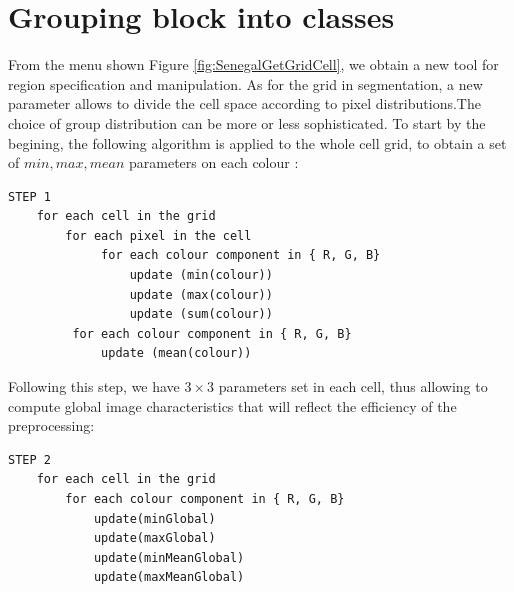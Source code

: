 \section { Grouping block into classes}
\label{sec:classification} 

From the menu shown Figure  \ref{fig:SenegalGetGridCell}, we obtain a new tool for region
specification and manipulation. As for the grid in segmentation, a new parameter allows to divide
the cell space according to pixel distributions.The choice of group distribution  can be more or less sophisticated.
To start by the begining, the following algorithm is applied to the whole cell grid, to obtain a set of $min, max, mean$ parameters
on each colour :

\begin{lstlisting}  
STEP 1
	for each cell in the grid
		for each pixel in the cell 
			 for each colour component in { R, G, B}
				 update (min(colour))
				 update (max(colour))
				 update (sum(colour))
		 for each colour component in { R, G, B}
			 update (mean(colour))
\end{lstlisting}

Following this step, we have $3 \times 3$ parameters set in each cell, thus allowing to compute
global image characteristics that will reflect the efficiency of the preprocessing:

\begin{lstlisting}  
STEP 2
	for each cell in the grid
		for each colour component in { R, G, B}
			update(minGlobal)
			update(maxGlobal)
			update(minMeanGlobal)
			update(maxMeanGlobal)
\end{lstlisting}

